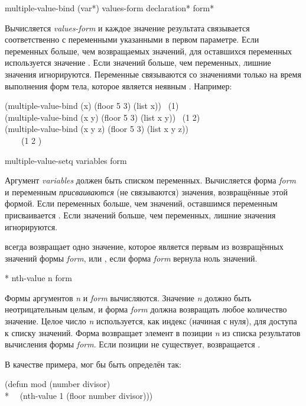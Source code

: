 \begin{defmac}
multiple-value-bind ({var}*) values-form
                    {declaration}* {form}*

Вычисляется \emph{values-form} и каждое значение результата связывается
соответственно с переменными указанными в первом параметре.
Если переменных больше, чем возвращаемых значений, для оставшихся переменных
используется значение {\false}. Если значений больше, чем переменных, лишние
значения игнорируются. Переменные связываются со значениями только на время
выполнения форм тела, которое является неявным .
Например:
\begin{lisp}
(multiple-value-bind (x) (floor 5 3) (list x)) \EV\ (1) \\
(multiple-value-bind (x y) (floor 5 3) (list x y)) \EV\ (1 2) \\
(multiple-value-bind (x y z) (floor 5 3) (list x y z)) \\
~~~\EV\ (1 2 {\false})
\end{lisp}
\end{defmac}

\begin{defmac}
multiple-value-setq variables form

Аргумент \emph{variables} должен быть списком переменных. Вычисляется форма
\emph{form} и переменным \emph{присваиваются} (не связываются) значения,
возвращённые этой формой. Если переменных больше, чем значений, оставшимся
переменным присваивается {\false}. Если значений больше, чем переменных, лишние
значения игнорируются.

 всегда возвращает одно значение, которое является
первым из возвращённых значений формы \emph{form}, или {\false}, если форма
\emph{form} вернула ноль значений.
\end{defmac}

\begin{defmac}*
nth-value n form

Формы аргументов \emph{n} и \emph{form} вычисляются.
Значение \emph{n} должно быть неотрицательным целым, и форма \emph{form} должна
возвращать любое количество значение.
Целое число \emph{n} используется, как индекс (начиная с нуля), для доступа к
списку значений.
Форма возвращает элемент в позиции \emph{n} из списка результатов вычисления
формы \emph{form}. Если позиции не существует, возвращается .

В качестве примера,  мог бы быть определён так:
\begin{lisp}
(defun mod (number divisor) \\*
~~(nth-value 1 (floor number divisor)))
\end{lisp}
\end{defmac}

